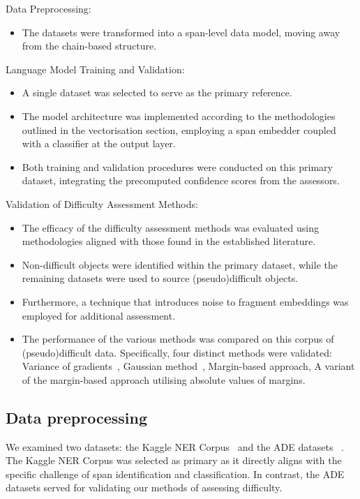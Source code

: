 \documentclass{article}
\begin{document}
Data Preprocessing:
\begin{itemize}
\item The datasets were transformed into a span-level data model, moving away from the chain-based structure.
\end{itemize}

Language Model Training and Validation:
\begin{itemize}
\item A single dataset was selected to serve as the primary reference.
\item The model architecture was implemented according to the methodologies outlined in the vectorisation section, employing a span embedder coupled with a classifier at the output layer.
\item Both training and validation procedures were conducted on this primary dataset, integrating the precomputed confidence scores from the assessors.
\end{itemize}

Validation of Difficulty Assessment Methods:
\begin{itemize}
\item The efficacy of the difficulty assessment methods was evaluated using methodologies aligned with those found in the established literature.
\item Non-difficult objects were identified within the primary dataset, while the remaining datasets were used to source (pseudo)difficult objects.
\item Furthermore, a technique that introduces noise to fragment embeddings was employed for additional assessment.
\item The performance of the various methods was compared on this corpus of (pseudo)difficult data. Specifically, four distinct methods were validated: Variance of gradients~\cite{agarwal2022estimating}, Gaussian method~\cite{Lee2018ASU}, Margin-based approach, A variant of the margin-based approach utilising absolute values of margins.
\end{itemize}

\subsection{Data preprocessing}
We examined two datasets: the Kaggle NER Corpus~\cite{kagglener} and the ADE datasets ~\cite{ade}. The Kaggle NER Corpus was selected as primary as it directly aligns with the specific challenge of span identification and classification. In contrast, the ADE datasets served for validating our methods of assessing difficulty.
\end{document}
